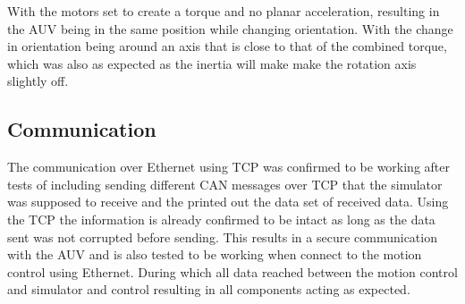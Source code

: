 With the motors set to create a torque and no planar acceleration, resulting in the AUV being in the same position while changing orientation. With the change in orientation being around an axis that is close to that of the combined torque, which was also as expected as the inertia will make make the rotation axis slightly off.

\subsection{Communication}
The communication over Ethernet using TCP was confirmed to be working after tests of including sending different CAN messages over TCP that the simulator was supposed to receive and the printed out the data set of received data. Using the TCP the information is already confirmed to be intact as long as the data sent was not corrupted before sending. This results in a secure communication with the AUV and is also tested to be working when connect to the motion control using Ethernet. During which all data reached between the motion control and simulator and control resulting in all components acting as expected. 